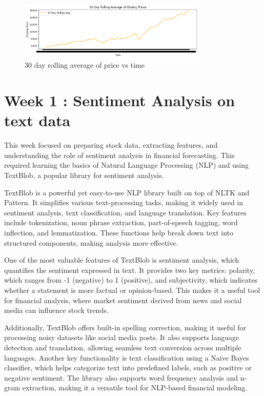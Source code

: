 \documentclass[12pt,a4paper]{article}
\begin{document}
\begin{figure}[!h]
    \centering
    \includegraphics[width=0.8\textwidth]{Week0_30Rolling_average.png} %
    \caption{30 day rolling average of price vs time}
    \label{fig3}
\end{figure}

\section{Week 1 : Sentiment Analysis on text data}
This week focused on preparing stock data, extracting features, and understanding the role of sentiment analysis in financial forecasting. This required learning the basics of Natural Language Processing (NLP) and using TextBlob, a popular library for sentiment analysis.

TextBlob is a powerful yet easy-to-use NLP library built on top of NLTK and Pattern. It simplifies various text-processing tasks, making it widely used in sentiment analysis, text classification, and language translation. Key features include tokenization, noun phrase extraction, part-of-speech tagging, word inflection, and lemmatization. These functions help break down text into structured components, making analysis more effective.

One of the most valuable features of TextBlob is sentiment analysis, which quantifies the sentiment expressed in text. It provides two key metrics: polarity, which ranges from -1 (negative) to 1 (positive), and subjectivity, which indicates whether a statement is more factual or opinion-based. This makes it a useful tool for financial analysis, where market sentiment derived from news and social media can influence stock trends.

Additionally, TextBlob offers built-in spelling correction, making it useful for processing noisy datasets like social media posts. It also supports language detection and translation, allowing seamless text conversion across multiple languages. Another key functionality is text classification using a Naive Bayes classifier, which helps categorize text into predefined labels, such as positive or negative sentiment. The library also supports word frequency analysis and n-gram extraction, making it a versatile tool for NLP-based financial modeling.
\end{document}
